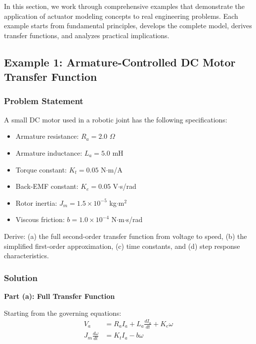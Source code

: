 In this section, we work through comprehensive examples that demonstrate the application of actuator modeling concepts to real engineering problems. Each example starts from fundamental principles, develops the complete model, derives transfer functions, and analyzes practical implications.

\subsection{Example 1: Armature-Controlled DC Motor Transfer Function}

\subsubsection{Problem Statement}

A small DC motor used in a robotic joint has the following specifications:
\begin{itemize}
    \item Armature resistance: $R_a = 2.0$ $\Omega$
    \item Armature inductance: $L_a = 5.0$ mH
    \item Torque constant: $K_t = 0.05$ N$\cdot$m/A
    \item Back-EMF constant: $K_e = 0.05$ V$\cdot$s/rad
    \item Rotor inertia: $J_m = 1.5 \times 10^{-5}$ kg$\cdot$m$^2$
    \item Viscous friction: $b = 1.0 \times 10^{-4}$ N$\cdot$m$\cdot$s/rad
\end{itemize}

Derive: (a) the full second-order transfer function from voltage to speed, (b) the simplified first-order approximation, (c) time constants, and (d) step response characteristics.

\subsubsection{Solution}

\textbf{Part (a): Full Transfer Function}

Starting from the governing equations:
\begin{align}
    V_a &= R_a I_a + L_a \frac{dI_a}{dt} + K_e \omega \\
    J_m \frac{d\omega}{dt} &= K_t I_a - b \omega
\end{align}

